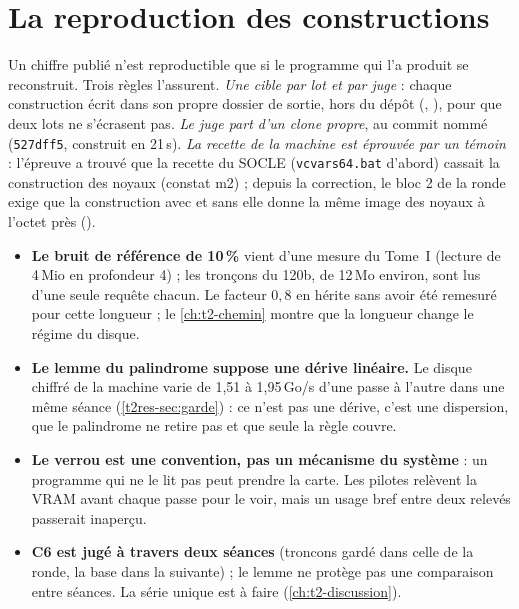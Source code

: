 \section{La reproduction des constructions}\label{t2ann:sec:construction}

Un chiffre publié n'est reproductible que si le programme qui l'a produit se reconstruit. Trois règles l'assurent. \emph{Une cible par lot et par juge} : chaque construction écrit dans son propre dossier de sortie, hors du dépôt (, ), pour que deux lots ne s'écrasent pas. \emph{Le juge part d'un clone propre}, au commit nommé (\texttt{527dff5}, construit en 21\,s). \emph{La recette de la machine est éprouvée par un témoin} : l'épreuve a trouvé que la recette du SOCLE (\texttt{vcvars64.bat} d'abord) cassait la construction des noyaux (constat m2) ; depuis la correction, le bloc 2 de la ronde exige que la construction avec et sans elle donne la même image des noyaux à l'octet près ().

\begin{faux}
\begin{itemize}
\item \textbf{Le bruit de référence de 10\,\%} vient d'une mesure du Tome~I (lecture de 4\,Mio en profondeur 4) ; les tronçons du 120b, de 12\,Mo environ, sont lus d'une seule requête chacun. Le facteur $0{,}8$ en hérite sans avoir été remesuré pour cette longueur ; le \cref{ch:t2-chemin} montre que la longueur change le régime du disque.
\item \textbf{Le lemme du palindrome suppose une dérive linéaire.} Le disque chiffré de la machine varie de 1,51 à 1,95\,Go/s d'une passe à l'autre dans une même séance (\cref{t2res-sec:garde}) : ce n'est pas une dérive, c'est une dispersion, que le palindrome ne retire pas et que seule la règle couvre.
\item \textbf{Le verrou est une convention, pas un mécanisme du système} : un programme qui ne le lit pas peut prendre la carte. Les pilotes relèvent la VRAM avant chaque passe pour le voir, mais un usage bref entre deux relevés passerait inaperçu.
\item \textbf{C6 est jugé à travers deux séances} (troncons gardé dans celle de la ronde, la base dans la suivante) ; le lemme ne protège pas une comparaison entre séances. La série unique est à faire (\cref{ch:t2-discussion}).
\end{itemize}
\end{faux}
